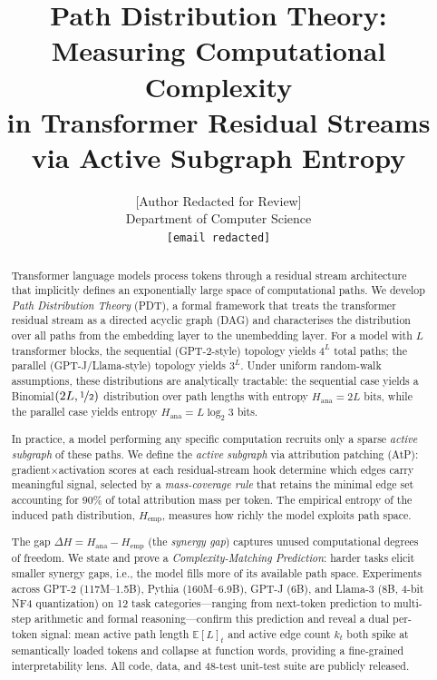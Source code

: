 \documentclass{article}
\title{Path Distribution Theory: Measuring Computational Complexity\\
in Transformer Residual Streams via Active Subgraph Entropy}
\author{%
  [Author Redacted for Review] \\
  Department of Computer Science \\
  \texttt{[email redacted]}
}
\newcommand{\E}{\mathbb{E}}
\newcommand{\Hana}{H_{\mathrm{ana}}}
\newcommand{\Hemp}{H_{\mathrm{emp}}}
\newcommand{\DeltaH}{\Delta H}
\begin{document}
\maketitle

\begin{abstract}
Transformer language models process tokens through a residual stream architecture
that implicitly defines an exponentially large space of computational paths.
We develop \emph{Path Distribution Theory} (PDT), a formal framework that treats
the transformer residual stream as a directed acyclic graph (DAG) and characterises
the distribution over all paths from the embedding layer to the unembedding layer.
For a model with $L$ transformer blocks, the sequential (GPT-2-style) topology
yields $4^L$ total paths; the parallel (GPT-J/Llama-style) topology yields $3^L$.
Under uniform random-walk assumptions, these distributions are analytically
tractable: the sequential case yields a Binomial$(2L,\nicefrac{1}{2})$ distribution
over path lengths with entropy $\Hana = 2L$ bits, while the parallel case yields
entropy $\Hana = L\log_2 3$ bits.

In practice, a model performing any specific computation recruits only a sparse
\emph{active subgraph} of these paths.  We define the \emph{active subgraph} via
attribution patching (AtP): gradient$\times$activation scores at each
residual-stream hook determine which edges carry meaningful signal, selected by a
\emph{mass-coverage rule} that retains the minimal edge set accounting for 90\% of
total attribution mass per token.  The empirical entropy of the induced path
distribution, $\Hemp$, measures how richly the model exploits path space.

The gap $\DeltaH = \Hana - \Hemp$ (the \emph{synergy gap}) captures unused
computational degrees of freedom.  We state and prove a
\emph{Complexity-Matching Prediction}: harder tasks elicit smaller synergy gaps,
i.e., the model fills more of its available path space.  Experiments across
GPT-2 (117M–1.5B), Pythia (160M–6.9B), GPT-J (6B), and
Llama-3 (8B, 4-bit NF4 quantization) on 12 task categories—ranging from
next-token prediction to multi-step arithmetic and formal reasoning—confirm
this prediction and reveal a dual per-token signal: mean active path length
$\E[L]_t$ and active edge count $k_t$ both spike at semantically loaded tokens
and collapse at function words, providing a fine-grained interpretability lens.
All code, data, and 48-test unit-test suite are publicly released.
\end{abstract}
\end{document}
